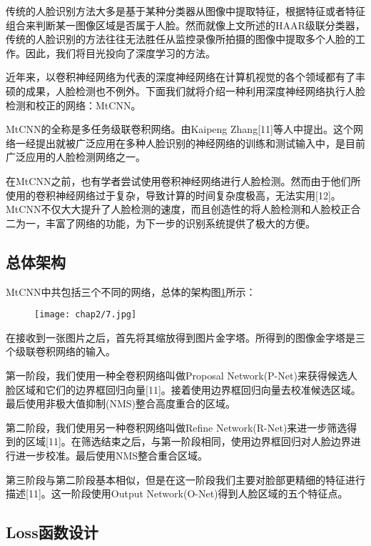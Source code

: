 传统的人脸识别方法大多是基于某种分类器从图像中提取特征，根据特征或者特征组合来判断某一图像区域是否属于人脸。然而就像上文所述的HAAR级联分类器，传统的人脸识别的方法往往无法胜任从监控录像所拍摄的图像中提取多个人脸的工作。因此，我们将目光投向了深度学习的方法。

近年来，以卷积神经网络为代表的深度神经网络在计算机视觉的各个领域都有了丰硕的成果，人脸检测也不例外。下面我们就将介绍一种利用深度神经网络执行人脸检测和校正的网络：MtCNN。

MtCNN的全称是多任务级联卷积网络。由Kaipeng Zhang[11]等人中提出。这个网络一经提出就被广泛应用在多种人脸识别的神经网络的训练和测试输入中，是目前广泛应用的人脸检测网络之一。

在MtCNN之前，也有学者尝试使用卷积神经网络进行人脸检测。然而由于他们所使用的卷积神经网络过于复杂，导致计算的时间复杂度极高，无法实用[12]。MtCNN不仅大大提升了人脸检测的速度，而且创造性的将人脸检测和人脸校正合二为一，丰富了网络的功能，为下一步的识别系统提供了极大的方便。

\subsection{总体架构}

MtCNN中共包括三个不同的网络，总体的架构图\ref{fig:mtcnn}所示：

\begin{figure}[!htp]
	\centering
	\texttt{[image: chap2/7.jpg]}
	\label{fig:mtcnn}
\end{figure}

在接收到一张图片之后，首先将其缩放得到图片金字塔。所得到的图像金字塔是三个级联卷积网络的输入。

第一阶段，我们使用一种全卷积网络叫做Proposal Network(P-Net)来获得候选人脸区域和它们的边界框回归向量[11]。接着使用边界框回归向量去校准候选区域。最后使用非极大值抑制(NMS)整合高度重合的区域。

第二阶段，我们使用另一种卷积网络叫做Refine Network(R-Net)来进一步筛选得到的区域[11]。在筛选结束之后，与第一阶段相同，使用边界框回归对人脸边界进行进一步校准。最后使用NMS整合重合区域。

第三阶段与第二阶段基本相似，但是在这一阶段我们主要对脸部更精细的特征进行描述[11]。这一阶段使用Output Network(O-Net)得到人脸区域的五个特征点。

\subsection{Loss函数设计}

